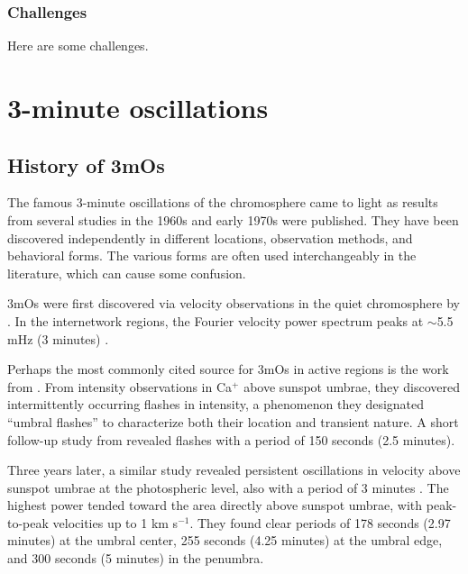 

\subsubsection{Challenges}

Here are some challenges.




\clearpage
\section{3-minute oscillations}



\subsection{History of 3mOs}


The famous 3-minute oscillations of the chromosphere
came to light as results from several studies in the 1960s and early
1970s were published.
They have been discovered independently in different locations,
observation methods, and behavioral forms.
The various forms
are often used interchangeably in the literature, which can cause
some confusion.

3mOs were first discovered via velocity observations in the quiet chromosphere
by \cite{Jensen1963}.
In the internetwork regions,
the Fourier velocity power spectrum peaks at
$\sim$5.5 mHz (3 minutes)
\citep{Orrall1966}.


Perhaps the most commonly cited source for 3mOs in active regions is the work from
\cite{Beckers1969}.
From intensity observations in Ca$^{+}$ above sunspot umbrae,
they discovered intermittently occurring flashes in intensity,
a phenomenon they designated
``umbral flashes'' to characterize
both their location and transient nature.
A short follow-up study from \cite{Wittmann1969} revealed
flashes with a period of 150 seconds (2.5 minutes).

Three years later, a similar study revealed
persistent oscillations in velocity above sunspot umbrae at the photospheric level,
also with a period of 3 minutes \citep{Beckers1974}.
The highest power tended toward the area
directly above sunspot umbrae, with peak-to-peak velocities up to
1 km s$^{-1}$.
They found clear periods of
178 seconds (2.97 minutes) at the umbral center,
255 seconds (4.25 minutes) at the umbral edge, and
300 seconds (5 minutes) in the penumbra.

